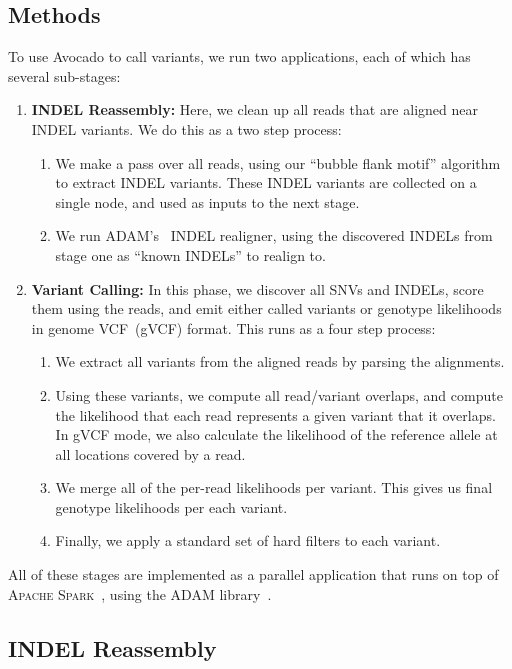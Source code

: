 \documentclass{bioinfo}
\begin{document}
\begin{methods}
\section{Methods}

To use Avocado to call variants, we run two applications, each of which has several
sub-stages:

\begin{enumerate}
\item \textbf{INDEL Reassembly:} Here, we clean up all reads that are aligned
near INDEL variants. We do this as a two step process:
\begin{enumerate}
\item We make a pass over all reads, using our ``bubble flank motif'' algorithm
to extract INDEL variants. These INDEL variants are collected on a single node,
and used as inputs to the next stage.
\item We run \textsc{ADAM}'s~\citep{massie13, nothaft15} INDEL realigner, using the
discovered INDELs from stage one as ``known INDELs'' to realign to.
\end{enumerate}
\item \textbf{Variant Calling:} In this phase, we discover all SNVs and INDELs,
score them using the reads, and emit either called variants or genotype
likelihoods in genome VCF~(gVCF) format. This runs as a four step process:
\begin{enumerate}
\item We extract all variants from the aligned reads by parsing the alignments.
\item Using these variants, we compute all read/variant overlaps, and compute
the likelihood that each read represents a given variant that it overlaps. In
gVCF mode, we also calculate the likelihood of the reference allele at all
locations covered by a read.
\item We merge all of the per-read likelihoods per variant. This gives us final
genotype likelihoods per each variant.
\item Finally, we apply a standard set of hard filters to each variant.
\end{enumerate}
\end{enumerate}

All of these stages are implemented as a parallel application that runs on top of
\textsc{Apache Spark}~\citep{zaharia10, zaharia12}, using the \textsc{ADAM}
library~\citep{massie13, nothaft15}.

\subsection{INDEL Reassembly}
\label{sec:indel-reassembly}


\end{methods}
\end{document}

